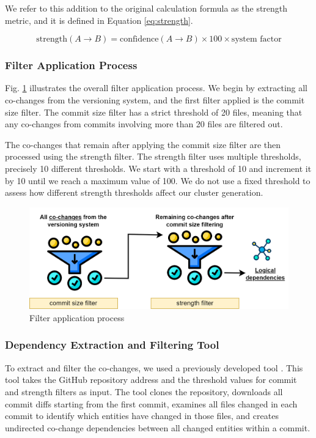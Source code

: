 \documentclass[12pt, a4paper, twoside]{report}
\begin{document}
We refer to this addition to the original calculation formula as the strength metric, and it is defined in Equation \eqref{eq:strength}.

\begin{equation}
\text{strength}(A \rightarrow B) = \text{confidence}(A \rightarrow B) \times 100 \times \text{system factor}
\label{eq:strength}
\end{equation}


\subsubsection{Filter Application Process}

Fig. \ref{fig:filtering} illustrates the overall filter application process. We begin by extracting all co-changes from the versioning system, and the first filter applied is the commit size filter. The commit size filter has a strict threshold of 20 files, meaning that any co-changes from commits involving more than 20 files are filtered out.

The co-changes that remain after applying the commit size filter are then processed using the strength filter. The strength filter uses multiple thresholds, precisely 10 different thresholds. We start with a threshold of 10 and increment it by 10 until we reach a maximum value of 100. We do not use a fixed threshold to assess how different strength thresholds affect our cluster generation.

\begin{figure}[t!]
  \centering
  \includegraphics[width=\columnwidth]{filtering.png}
  \caption{Filter application process}
  \label{fig:filtering}
\end{figure}

\subsubsection{Dependency Extraction and Filtering Tool}

To extract and filter the co-changes, we used a previously developed tool \cite{b4}. This tool takes the GitHub repository address and the threshold values for commit and strength filters as input. The tool clones the repository, downloads all commit diffs starting from the first commit, examines all files changed in each commit to identify which entities have changed in those files, and creates undirected co-change dependencies between all changed entities within a commit.
\end{document}
